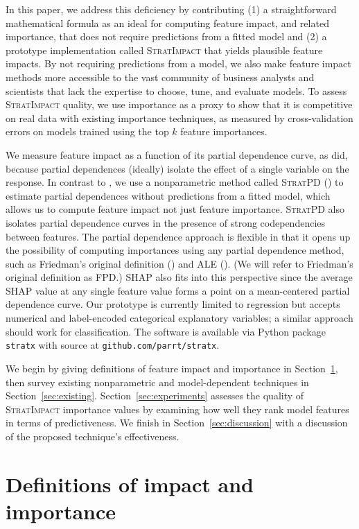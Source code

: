\documentclass[11pt]{article}
\newcommand{\secref}[1]{Section~\ref{#1}}
\newcommand{\simp}{\fontfamily{cmr}\textsc{\small StratImpact}}
\newcommand{\spd}{\fontfamily{cmr}\textsc{\small StratPD}}
\begin{document}
In this paper, we address this deficiency by contributing (1) a straightforward mathematical formula as an ideal for computing feature impact, and related importance, that does not require predictions from a fitted model and (2) a prototype implementation called \simp{} that yields plausible feature impacts. By not requiring predictions from a model, we also make feature impact methods more accessible to the vast  community of business analysts and scientists that lack the expertise to choose, tune, and evaluate models. To assess \simp{} quality, we use importance as a proxy to show that it is competitive on real data with existing importance techniques, as measured by cross-validation errors on models trained using the top $k$ feature importances.  

We measure feature impact as a function of its partial dependence curve, as \cite{pdvim} did, because partial dependences (ideally) isolate the effect of a single variable on the response. In contrast to \cite{pdvim}, we use a nonparametric method called \spd{} (\citealt{stratpd}) to estimate partial dependences without predictions from a fitted model, which allows us to compute feature impact not just feature importance. \spd{} also isolates partial dependence curves in the presence of strong codependencies between features. The partial dependence approach is flexible in that it opens up the possibility of computing importances using any partial dependence method, such as Friedman's original definition (\citealt{PDP}) and ALE (\citealt{ALE}). (We will refer to Friedman's original definition as FPD.) SHAP also fits into this perspective since the average SHAP value at any single feature value forms a point on a mean-centered partial dependence curve. Our prototype is currently limited to regression but accepts numerical and label-encoded categorical explanatory variables; a similar approach should work for classification. The software is available via Python package {\tt stratx} with source at {\tt github.com/parrt/stratx}. 

We begin by giving definitions of feature impact and importance in \secref{sec:def}, then survey existing nonparametric and model-dependent techniques in \secref{sec:existing}. \secref{sec:experiments} assesses the quality of \simp{} importance values by examining how well they rank model features in terms of predictiveness. We finish in \secref{sec:discussion} with a discussion of the proposed technique's effectiveness.

\section{Definitions of impact and importance}\label{sec:def}
\end{document}
